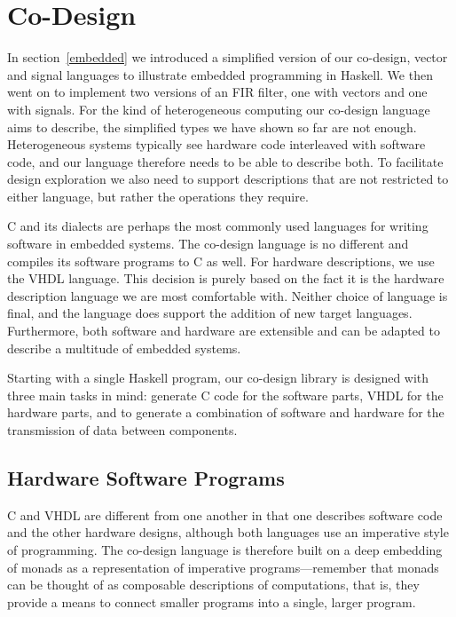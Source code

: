 \documentclass[../paper.tex]{subfiles}
\begin{document}
\chapter{Co-Design}
\label{codesign}

In section~\ref{embedded} we introduced a simplified version of our co-design, vector and signal languages to illustrate embedded programming in Haskell. We then went on to implement two versions of an FIR filter, one with vectors and one with signals. For the kind of heterogeneous computing our co-design language aims to describe, the simplified types we have shown so far are not enough. Heterogeneous systems typically see hardware code interleaved with software code, and our language therefore needs to be able to describe both. To facilitate design exploration we also need to support descriptions that are not restricted to either language, but rather the operations they require.

C and its dialects are perhaps the most commonly used languages for writing software in embedded systems. The co-design language is no different and compiles its software programs to C as well. For hardware descriptions, we use the VHDL language. This decision is purely based on the fact it is the hardware description language we are most comfortable with. Neither choice of language is final, and the language does support the addition of new target languages. Furthermore, both software and hardware are extensible and can be adapted to describe a multitude of embedded systems.

Starting with a single Haskell program, our co-design library is designed with three main tasks in mind: generate C code for the software parts, VHDL for the hardware parts, and to generate a combination of software and hardware for the transmission of data between components.

\section{Hardware Software Programs}
\label{program}

C and VHDL are different from one another in that one describes software code and the other hardware designs, although both languages use an imperative style of programming. The co-design language is therefore built on a deep embedding of monads as a representation of imperative programs---remember that monads can be thought of as composable descriptions of computations, that is, they provide a means to connect smaller programs into a single, larger program.
\end{document}
